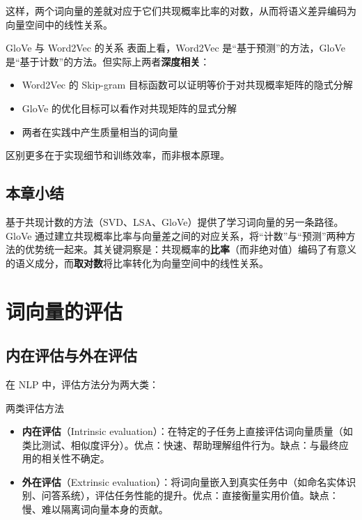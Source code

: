 \documentclass[a4paper]{article}
\begin{document}
这样，两个词向量的差就对应于它们共现概率比率的对数，从而将语义差异编码为向量空间中的线性关系。

\begin{knowledgebox}{GloVe 与 Word2Vec 的关系}
表面上看，Word2Vec 是``基于预测''的方法，GloVe 是``基于计数''的方法。但实际上两者\textbf{深度相关}：
\begin{itemize}
    \item Word2Vec 的 Skip-gram 目标函数可以证明等价于对共现概率矩阵的隐式分解
    \item GloVe 的优化目标可以看作对共现矩阵的显式分解
    \item 两者在实践中产生质量相当的词向量
\end{itemize}
区别更多在于实现细节和训练效率，而非根本原理。
\end{knowledgebox}

\subsection{本章小结}

基于共现计数的方法（SVD、LSA、GloVe）提供了学习词向量的另一条路径。GloVe 通过建立共现概率比率与向量差之间的对应关系，将``计数''与``预测''两种方法的优势统一起来。其关键洞察是：共现概率的\textbf{比率}（而非绝对值）编码了有意义的语义成分，而\textbf{取对数}将比率转化为向量空间中的线性关系。


\section{词向量的评估}

\subsection{内在评估与外在评估}

在 NLP 中，评估方法分为两大类：

\begin{importantbox}{两类评估方法}
\begin{itemize}
    \item \textbf{内在评估}（Intrinsic evaluation）：在特定的子任务上直接评估词向量质量（如类比测试、相似度评分）。优点：快速、帮助理解组件行为。缺点：与最终应用的相关性不确定。
    \item \textbf{外在评估}（Extrinsic evaluation）：将词向量嵌入到真实任务中（如命名实体识别、问答系统），评估任务性能的提升。优点：直接衡量实用价值。缺点：慢、难以隔离词向量本身的贡献。
\end{itemize}
\end{importantbox}
\end{document}
